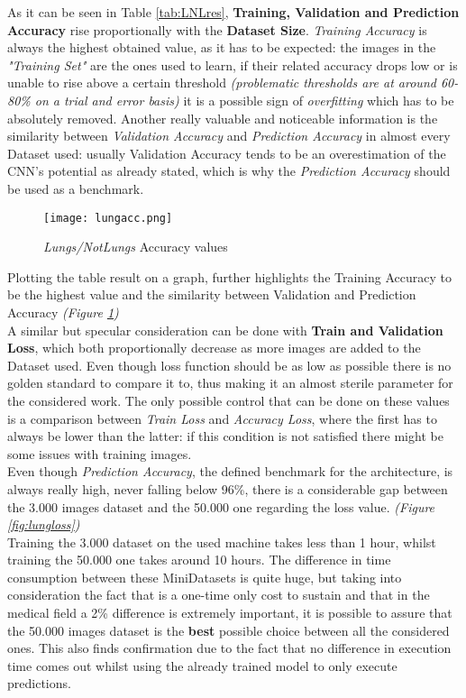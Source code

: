 \documentclass[../main.tex]{subfiles}
\begin{document}
As it can be seen in Table \ref{tab:LNLres}, \textbf{Training, Validation and Prediction Accuracy} rise proportionally with the \textbf{Dataset Size}. \textit{Training Accuracy} is always the highest obtained value, as it has to be expected: the images in the \textit{"Training Set"} are the ones used to learn, if their related accuracy drops low or is unable to rise above a certain threshold \textit{(problematic thresholds are at around 60-80\% on a trial and error basis)} it is a possible sign of \textit{overfitting} which has to be absolutely removed. Another really valuable and noticeable information is the similarity between \textit{Validation Accuracy} and \textit{Prediction Accuracy} in almost every Dataset used: usually Validation Accuracy tends to be an overestimation of the CNN's potential as already stated, which is why the \textit{Prediction Accuracy} should be used as a benchmark.\\
\begin{figure}[H]
	\centering
	\texttt{[image: lungacc.png]}
	\caption{\textit{Lungs/NotLungs} Accuracy values}
	\label{fig:lungacc}
\end{figure}

Plotting the table result on a graph, further highlights the Training Accuracy to be the highest value and the similarity between Validation and Prediction Accuracy \textit{(Figure \ref{fig:lungacc})} \\
A similar but specular consideration can be done with \textbf{Train and Validation Loss}, which both proportionally decrease as more images are added to the Dataset used. Even though loss function should be as low as possible there is no golden standard to compare it to, thus making it an almost sterile parameter for the considered work. The only possible control that can be done on these values is a comparison between \textit{Train Loss} and \textit{Accuracy Loss}, where the first has to always be lower than the latter: if this condition is not satisfied there might be some issues with training images.\\
\vspace{5mm}
Even though \textit{Prediction Accuracy}, the defined benchmark for the architecture, is always really high, never falling below 96\%, there is a considerable gap between the 3.000 images dataset and the 50.000 one regarding the loss value. \textit{(Figure \ref{fig:lungloss})} \\
Training the 3.000 dataset on the used machine takes less than 1 hour, whilst training the 50.000 one takes around 10 hours. The difference in time consumption between these MiniDatasets is quite huge, but taking into consideration the fact that is a one-time only cost to sustain and that in the medical field a 2\% difference is extremely important, it is possible to assure that the 50.000 images dataset is the \textbf{best} possible choice between all the considered ones. This also finds confirmation due to the fact that no difference in execution time comes out whilst using the already trained model to only execute predictions.
\end{document}
